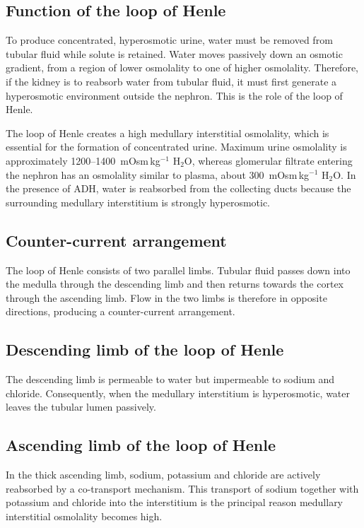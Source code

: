 \documentclass[11pt,a4paper]{article}
\begin{document}
\subsection{Function of the loop of Henle}

To produce concentrated, hyperosmotic urine, water must be removed from tubular fluid while solute is retained. Water moves passively down an osmotic gradient, from a region of lower osmolality to one of higher osmolality. Therefore, if the kidney is to reabsorb water from tubular fluid, it must first generate a hyperosmotic environment outside the nephron. This is the role of the loop of Henle.

The loop of Henle creates a high medullary interstitial osmolality, which is essential for the formation of concentrated urine. Maximum urine osmolality is approximately 1200--1400~mOsm\,kg$^{-1}$ H$_2$O, whereas glomerular filtrate entering the nephron has an osmolality similar to plasma, about 300~mOsm\,kg$^{-1}$ H$_2$O. In the presence of ADH, water is reabsorbed from the collecting ducts because the surrounding medullary interstitium is strongly hyperosmotic.

\subsection{Counter-current arrangement}

The loop of Henle consists of two parallel limbs. Tubular fluid passes down into the medulla through the descending limb and then returns towards the cortex through the ascending limb. Flow in the two limbs is therefore in opposite directions, producing a counter-current arrangement.

\subsection{Descending limb of the loop of Henle}

The descending limb is permeable to water but impermeable to sodium and chloride. Consequently, when the medullary interstitium is hyperosmotic, water leaves the tubular lumen passively.

\subsection{Ascending limb of the loop of Henle}

In the thick ascending limb, sodium, potassium and chloride are actively reabsorbed by a co-transport mechanism. This transport of sodium together with potassium and chloride into the interstitium is the principal reason medullary interstitial osmolality becomes high.
\end{document}
